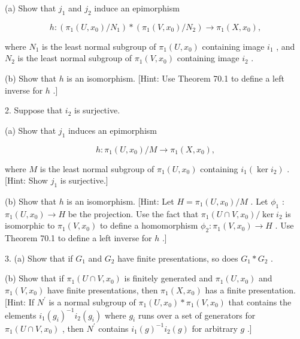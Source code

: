 (a) Show that \({j}_{1}\) and \({j}_{2}\) induce an epimorphism

\[
h : \left( {{\pi }_{1}\left( {U,{x}_{0}}\right) /{N}_{1}}\right)  * \left( {{\pi }_{1}\left( {V,{x}_{0}}\right) /{N}_{2}}\right)  \rightarrow  {\pi }_{1}\left( {X,{x}_{0}}\right) ,
\]

where \({N}_{1}\) is the least normal subgroup of \({\pi }_{1}\left( {U,{x}_{0}}\right)\) containing image \({i}_{1}\) , and \({N}_{2}\) is the least normal subgroup of \({\pi }_{1}\left( {V,{x}_{0}}\right)\) containing image \({i}_{2}\) .

(b) Show that \(h\) is an isomorphism. [Hint: Use Theorem 70.1 to define a left inverse for \(h\) .]

2. Suppose that \({i}_{2}\) is surjective.

(a) Show that \({j}_{1}\) induces an epimorphism

\[
h : {\pi }_{1}\left( {U,{x}_{0}}\right) /M \rightarrow  {\pi }_{1}\left( {X,{x}_{0}}\right) ,
\]

where \(M\) is the least normal subgroup of \({\pi }_{1}\left( {U,{x}_{0}}\right)\) containing \({i}_{1}\left( {\ker {i}_{2}}\right)\) . [Hint: Show \({j}_{1}\) is surjective.]

(b) Show that \(h\) is an isomorphism. [Hint: Let \(H = {\pi }_{1}\left( {U,{x}_{0}}\right) /M\) . Let \({\phi }_{1}\) : \({\pi }_{1}\left( {U,{x}_{0}}\right)  \rightarrow  H\) be the projection. Use the fact that \({\pi }_{1}\left( {U \cap  V,{x}_{0}}\right) /\ker {i}_{2}\) is isomorphic to \({\pi }_{1}\left( {V,{x}_{0}}\right)\) to define a homomorphism \({\phi }_{2} : {\pi }_{1}\left( {V,{x}_{0}}\right)  \rightarrow  H\) . Use Theorem 70.1 to define a left inverse for \(h\) .]

3. (a) Show that if \({G}_{1}\) and \({G}_{2}\) have finite presentations, so does \({G}_{1} * {G}_{2}\) .

(b) Show that if \({\pi }_{1}\left( {U \cap  V,{x}_{0}}\right)\) is finitely generated and \({\pi }_{1}\left( {U,{x}_{0}}\right)\) and \({\pi }_{1}\left( {V,{x}_{0}}\right)\) have finite presentations, then \({\pi }_{1}\left( {X,{x}_{0}}\right)\) has a finite presentation. [Hint: If \({N}^{\prime }\) is a normal subgroup of \({\pi }_{1}\left( {U,{x}_{0}}\right)  * {\pi }_{1}\left( {V,{x}_{0}}\right)\) that contains the elements \({i}_{1}{\left( {g}_{i}\right) }^{-1}{i}_{2}\left( {g}_{i}\right)\) where \({g}_{i}\) runs over a set of generators for \({\pi }_{1}\left( {U \cap  V,{x}_{0}}\right)\) , then \({N}^{\prime }\) contains \({i}_{1}{\left( g\right) }^{-1}{i}_{2}\left( g\right)\) for arbitrary \(g\) .]

